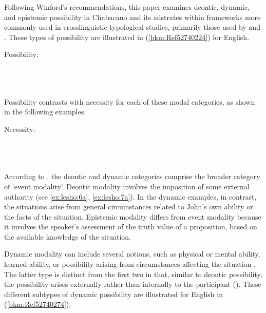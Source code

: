 \documentclass[output=paper,colorlinks,citecolor=brown]{langscibook}
\begin{document}
Following Winford’s recommendations, this paper examines deontic, dynamic, and epistemic possibility in Chabacano and its adstrates within frameworks more commonly used in crosslinguistic typological studies, primarily those used by \citet{Palmer2001} and \citet{vanderAuweraPlungian1998}. These types of possibility are illustrated in (\ref{bkm:Ref52740224}) for English.

\ea
{\label{bkm:Ref52740224}Possibility:}\\
\\
\\
\\
\z
\z

\begin{sloppypar}Possibility contrasts with necessity for each of these modal categories, as shown in the following examples.\end{sloppypar}

\ea Necessity:\\
\\
\\
\\
\z
\z


According to \citet{Palmer2001}, the deontic and dynamic categories comprise the broader category of ‘event modality’. Deontic modality involves the imposition of some external authority (see \ref{ex:lesho:6a}, \ref{ex:lesho:7a}). In the dynamic examples, in contrast, the situations arise from general circumstances related to John’s own ability or the facts of the situation. Epistemic modality differs from event modality because it involves the speaker’s assessment of the truth value of a proposition, based on the available knowledge of the situation.

Dynamic modality can include several notions, such as physical or mental ability, learned ability, or possibility arising from circumstances affecting the situation \citep{Palmer2001}. The latter type is distinct from the first two in that, similar to deontic possibility, the possibility arises externally rather than internally to the participant (\citealt{vanderAuweraPlungian1998}). These different subtypes of dynamic possibility are illustrated for English in (\ref{bkm:Ref52740274}).
\end{document}

